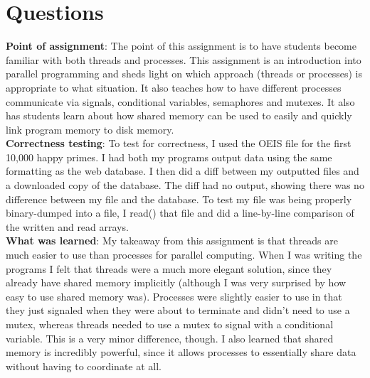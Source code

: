 \documentclass[11pt]{article}
\begin{document}
\section{Questions}
\textbf{Point of assignment}: The point of this assignment is to have students become familiar with both threads and processes. This assignment is an introduction into parallel programming and sheds light on which approach (threads or processes) is appropriate to what situation. It also teaches how to have different processes communicate via signals, conditional variables, semaphores and mutexes. It also has students learn about how shared memory can be used to easily and quickly link program memory to disk memory.\\

\textbf{Correctness testing}: To test for correctness, I used the OEIS file for the first 10,000 happy primes. I had both my programs output data using the same formatting as the web database. I then did a diff between my outputted files and a downloaded copy of the database. The diff had no output, showing there was no difference between my file and the database. To test my file was being properly binary-dumped into a file, I read() that file and did a line-by-line comparison of the written and read arrays. \\

\textbf{What was learned}: My takeaway from this assignment is that threads are much easier to use than processes for parallel computing. When I was writing the programs I felt that threads were a much more elegant solution, since they already have shared memory implicitly (although I was very surprised by how easy to use shared memory was). Processes were slightly easier to use in that they just signaled when they were about to terminate and didn't need to use a mutex, whereas threads needed to use a mutex to signal with a conditional variable. This is a very minor difference, though. I also learned that shared memory is incredibly powerful, since it allows processes to essentially share data without having to coordinate at all. \\
\end{document}
